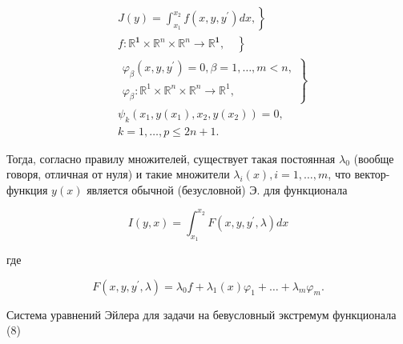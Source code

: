 \documentclass[10pt]{article}
\begin{document}
\[

\begin{aligned}

& \left.J(y)=\int_{x_{1}}^{x_{2}} f\left(x, y, y^{\prime}\right) d x,\right\} \\

& \left.f: \mathbb{R}^{\mathbf{1}} \times \mathbb{R}^{n} \times \mathbb{R}^{n} \longrightarrow \mathbb{R}^{\mathbf{1}}, \quad\right\} \\

& \left.\begin{array}{c}

\varphi_{\beta}\left(x, y, y^{\prime}\right)=0, \beta=1, \ldots, m<n, \\

\varphi_{\beta}: \mathbb{R}^{1} \times \mathbb{R}^{n} \times \mathbb{R}^{n} \longrightarrow \mathbb{R}^{1},

\end{array}\right\} \\

& \psi_{k}\left(x_{1}, y\left(x_{1}\right), x_{2}, y\left(x_{2}\right)\right)=0 \text {, } \\

& k=1, \ldots, p \leqslant 2 n+1 \text {. }

\end{aligned}

\]



Тогда, согласно правилу множителей, существует такая постоянная $\lambda_{0}$ (вообще говоря, отличная от нуля) и такие множители $\lambda_{i}(x), i=1, \ldots, m$, что вектор-функция $y(x)$ является обычной (безусловной) Э. для функционала



\[

I(y, x)=\int_{x_{1}}^{x_{2}} F\left(x, y, y^{\prime}, \lambda\right) d x

\]



где



\[

F\left(x, y, y^{\prime}, \lambda\right)=\lambda_{0} f+\lambda_{1}(x) \varphi_{1}+\ldots+\lambda_{m} \varphi_{m} .

\]



Система уравнений Эйлера для задачи на бевусловный экстремум функционала (8)
\end{document}
